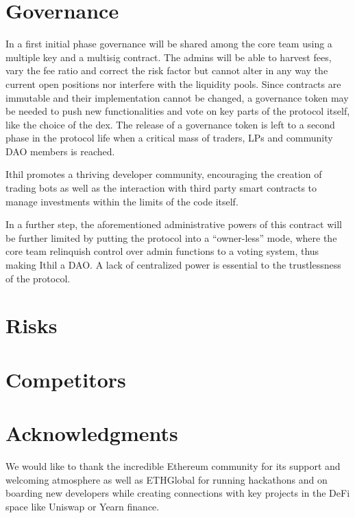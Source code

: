 \documentclass[a4paper,10 pt]{article}
\theoremstyle{definition}
\begin{document}
\section{Governance}
In a first initial phase governance will be shared among the core team using a multiple key and a multisig contract. The admins will be able to harvest fees, vary the fee ratio and correct the risk factor but cannot alter in any way the current open positions nor interfere with the liquidity pools.
Since contracts are immutable and their implementation cannot be changed, a governance token may be needed to push new functionalities and vote on key parts of the protocol itself, like the choice of the dex. The release of a governance token is left to a second phase in the protocol life when a critical mass of traders, LPs and community DAO members is reached.

Ithil promotes a thriving developer community, encouraging the creation of trading bots as well as the interaction with third party smart contracts to manage investments within the limits of the code itself.

In a further step, the aforementioned administrative powers of this contract will be further limited by putting the protocol into a “owner-less” mode, where the core team relinquish control over admin functions to a voting system, thus making Ithil a DAO. A lack of centralized power is essential to the trustlessness of the protocol.

\section{Risks}

\section{Competitors}

\section{Acknowledgments}

We would like to thank the incredible Ethereum community for its support and welcoming atmosphere as well as ETHGlobal for running hackathons and on boarding new developers while creating connections with key projects in the DeFi space like Uniswap or Yearn finance.
\end{document}
